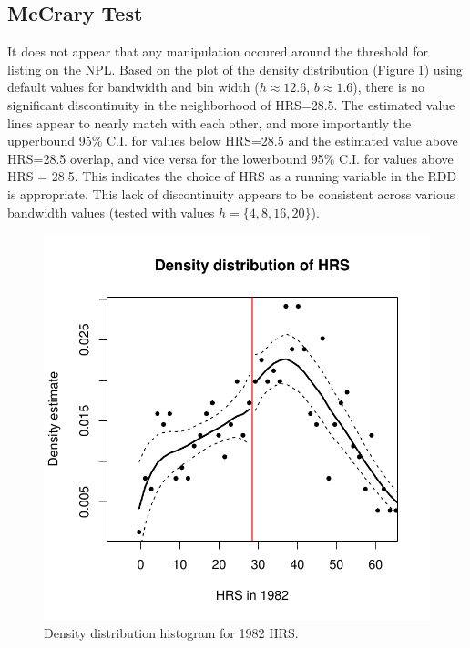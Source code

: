 \documentclass[letterpaper, 12pt]{article}
\begin{document}
\subsection{McCrary Test}
It does not appear that any manipulation occured around the threshold for listing on the NPL.  Based on the plot of the density distribution (Figure \ref{fig:ddplot}) using default values for bandwidth and bin width ($h \approx 12.6$, $b \approx 1.6$), there is no significant discontinuity in the neighborhood of HRS=28.5. The estimated value lines appear to nearly match with each other, and more importantly the upperbound 95\% C.I. for values below HRS=28.5 and the estimated value above HRS=28.5 overlap, and vice versa for the lowerbound 95\% C.I. for values above HRS = 28.5. This indicates the choice of HRS as a running variable in the RDD is appropriate. This lack of discontinuity appears to be consistent across various bandwidth values (tested with values $h = \{4, 8, 16, 20\}$).  

\begin{figure}[htbp]
\begin{center}
\includegraphics{ddplot.pdf}
\caption{Density distribution histogram for 1982 HRS.}
\label{fig:ddplot}
\end{center}
\end{figure}
\end{document}
